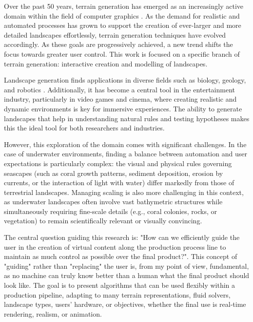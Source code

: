 Over the past 50 years, terrain generation has emerged as an increasingly active domain within the field of computer graphics \cite{Fournier1982,Musgrave1989,Miller1986,Galin2019}. As the demand for realistic and automated processes has grown to support the creation of ever-larger and more detailed landscapes effortlessly, terrain generation techniques have evolved accordingly. As these goals are progressively achieved, a new trend shifts the focus towards greater user control. This work is focused on a specific branch of terrain generation: interactive creation and modelling of landscapes.

Landscape generation finds applications in diverse fields such as biology, geology, and robotics \cite{Tzachor2023,Chen2023,Gerigk2025,Rudin2022}. Additionally, it has become a central tool in the entertainment industry, particularly in video games and cinema, where creating realistic and dynamic environments is key for immersive experiences. The ability to generate landscapes that help in understanding natural rules and testing hypotheses makes this the ideal tool for both researchers and industries.

However, this exploration of the domain comes with significant challenges. In the case of underwater environments, finding a balance between automation and user expectations is particularly complex: the visual and physical rules governing seascapes (such as coral growth patterns, sediment deposition, erosion by currents, or the interaction of light with water) differ markedly from those of terrestrial landscapes. Managing scaling is also more challenging in this context, as underwater landscapes often involve vast bathymetric structures while simultaneously requiring fine-scale details (e.g., coral colonies, rocks, or vegetation) to remain scientifically relevant or visually convincing.

The central question guiding this research is: "How can we efficiently guide the user in the creation of virtual content along the production process line to maintain as much control as possible over the final product?". This concept of "guiding" rather than "replacing" the user is, from my point of view, fundamental, as no machine can truly know better than a human what the final product should look like. The goal is to present algorithms that can be used flexibly within a production pipeline, adapting to many terrain representations, fluid solvers, landscape types, users' hardware, or objectives, whether the final use is real-time rendering, realism, or animation.

